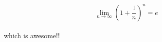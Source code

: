 \documentclass[preview]{standalone}
\begin{document}
\begin{center}
$$\lim_{n \to \infty} (1 + \frac 1n)^n = e$$ \\which is awesome!!
\end{center}
\end{document}
